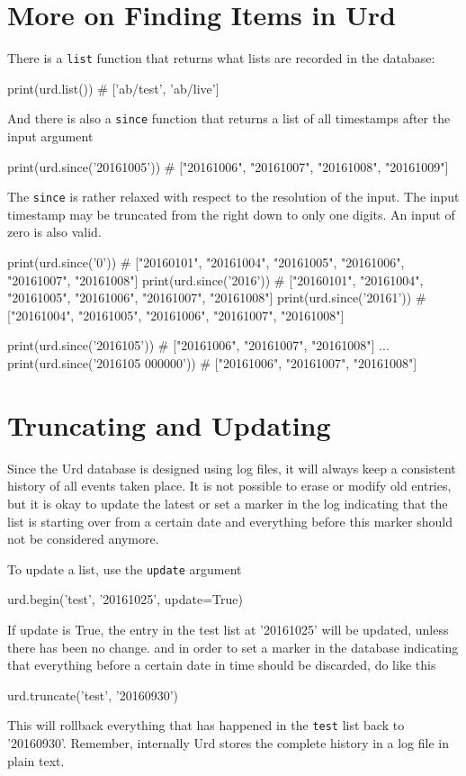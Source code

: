 \section{More on Finding Items in Urd}
There is a \texttt{list} function that returns what lists are recorded
in the database:
\begin{python}
  print(urd.list())
  # ['ab/test', 'ab/live']
\end{python}
And there is also a \texttt{since} function that returns a list of all
timestamps after the input argument
\begin{python}
  print(urd.since('20161005'))
  # ["20161006", "20161007", "20161008", "20161009"]
\end{python}
The \texttt{since} is rather relaxed with respect to the resolution of
the input.  The input timestamp may be truncated from the right down
to only one digits.  An input of zero is also valid.
\begin{python}
  print(urd.since('0'))
  # ["20160101", "20161004", "20161005", "20161006", "20161007", "20161008"]
  print(urd.since('2016'))
  # ["20160101", "20161004", "20161005", "20161006", "20161007", "20161008"]
  print(urd.since('20161'))
  # ["20161004", "20161005", "20161006", "20161007", "20161008"]

  print(urd.since('2016105'))
  # ["20161006", "20161007", "20161008"]
  ...
  print(urd.since('2016105 000000'))
  # ["20161006", "20161007", "20161008"]
\end{python}



\section{Truncating and Updating}
\label{sec:trunc-update}
Since the Urd database is designed using log files, it will always
keep a consistent history of all events taken place.  It is not
possible to erase or modify old entries, but it is okay to update the
latest or set a marker in the log indicating that the list is starting
over from a certain date and everything before this marker should not
be considered anymore.

To update a list, use the \texttt{update} argument
\begin{python}
urd.begin('test', '20161025', update=True)
\end{python}
If update is True, the entry in the test list at '20161025' will be
updated, unless there has been no change.  and in order to set a
marker in the database indicating that everything before a certain
date in time should be discarded, do like this
\begin{python}
urd.truncate('test', '20160930')
\end{python}
This will rollback everything that has happened in the \texttt{test}
list back to '20160930'.  Remember, internally Urd stores the complete
history in a log file in plain text.


